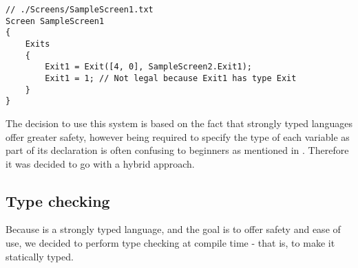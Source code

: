 \begin{lstlisting}[caption={Example of an illegal assingment}, label={lst:IllegalAssignment},escapechar=|]
// ./Screens/SampleScreen1.txt
Screen SampleScreen1 
{
	Exits 
	{
		Exit1 = Exit([4, 0], SampleScreen2.Exit1);
		Exit1 = 1; // Not legal because Exit1 has type Exit
	}
}
\end{lstlisting}

The decision to use this system is based on the fact that strongly typed languages offer greater safety, however being required to
specify the type of each variable as part of its declaration is often confusing to beginners as mentioned in .
Therefore it was decided to go with a hybrid approach.

\subsection*{Type checking}

Because \dazel is a strongly typed language, and the goal is to offer safety and ease of use, we decided to perform type checking at compile time - that is, to make it
statically typed.